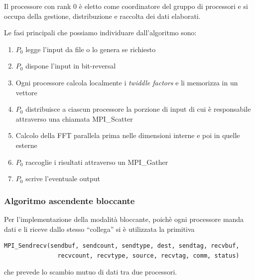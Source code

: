 \documentclass[12pt,a4paper,oneside,openright]{article}
\begin{document}
Il processore con rank 0 è eletto come coordinatore del gruppo di processori e si occupa della gestione, distribuzione e raccolta dei dati elaborati.

Le fasi principali che possiamo individuare dall'algoritmo sono:
\begin{enumerate}
\item $P_{0}$ legge l'input da file o lo genera se richiesto
\item $P_{0}$ dispone l'input in bit-reversal
\item Ogni processore calcola localmente i \emph{twiddle factors} e li memorizza in un vettore
\item $P_{0}$ distribuisce a ciascun processore la porzione di input di cui è responsabile attraverso una chiamata MPI\_Scatter
\item Calcolo della FFT parallela prima nelle dimensioni interne e poi in quelle esterne
\item $P_{0}$ raccoglie i risultati attraverso un MPI\_Gather
\item $P_{0}$ scrive l'eventuale output
\end{enumerate}
 
\subsubsection{Algoritmo ascendente bloccante}
Per l'implementazione della modalità bloccante, poichè ogni processore manda dati e li riceve dallo stesso ``collega'' si è utilizzata la primitiva
\begin{verbatim}
MPI_Sendrecv(sendbuf, sendcount, sendtype, dest, sendtag, recvbuf, 
               recvcount, recvtype, source, recvtag, comm, status)
\end{verbatim} 
che prevede lo scambio mutuo di dati tra due processori.  
\end{document}
